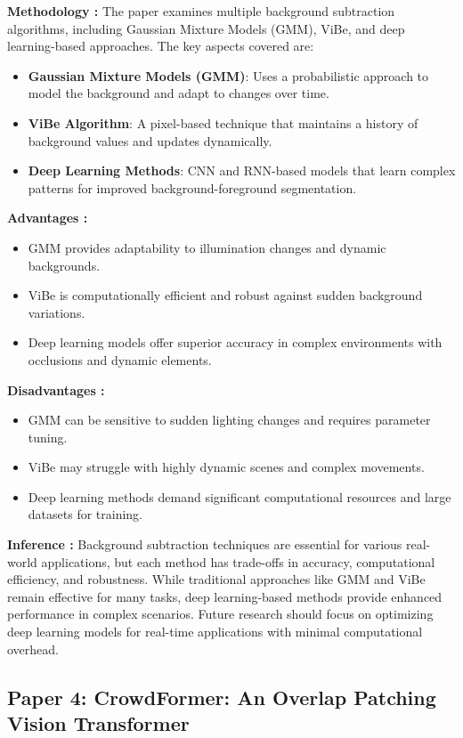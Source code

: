 \documentclass[11pt]{report}
\begin{document}
\textbf{Methodology : }
The paper examines multiple background subtraction algorithms, including Gaussian Mixture Models (GMM), ViBe, and deep learning-based approaches. The key aspects covered are:
\begin{itemize}
    \item 	\textbf{Gaussian Mixture Models (GMM)}: Uses a probabilistic approach to model the background and adapt to changes over time.
    \item 	\textbf{ViBe Algorithm}: A pixel-based technique that maintains a history of background values and updates dynamically.
    \item 	\textbf{Deep Learning Methods}: CNN and RNN-based models that learn complex patterns for improved background-foreground segmentation.
\end{itemize}

\textbf{Advantages : }
\begin{itemize}
    \item GMM provides adaptability to illumination changes and dynamic backgrounds.
    \item ViBe is computationally efficient and robust against sudden background variations.
    \item Deep learning models offer superior accuracy in complex environments with occlusions and dynamic elements.
\end{itemize}

\textbf{Disadvantages : }
\begin{itemize}
    \item GMM can be sensitive to sudden lighting changes and requires parameter tuning.
    \item ViBe may struggle with highly dynamic scenes and complex movements.
    \item Deep learning methods demand significant computational resources and large datasets for training.
\end{itemize}

\textbf{Inference : }
Background subtraction techniques are essential for various real-world applications, but each method has trade-offs in accuracy, computational efficiency, and robustness. While traditional approaches like GMM and ViBe remain effective for many tasks, deep learning-based methods provide enhanced performance in complex scenarios. Future research should focus on optimizing deep learning models for real-time applications with minimal computational overhead.


\subsection{Paper 4: CrowdFormer: An Overlap Patching Vision Transformer}
\end{document}
